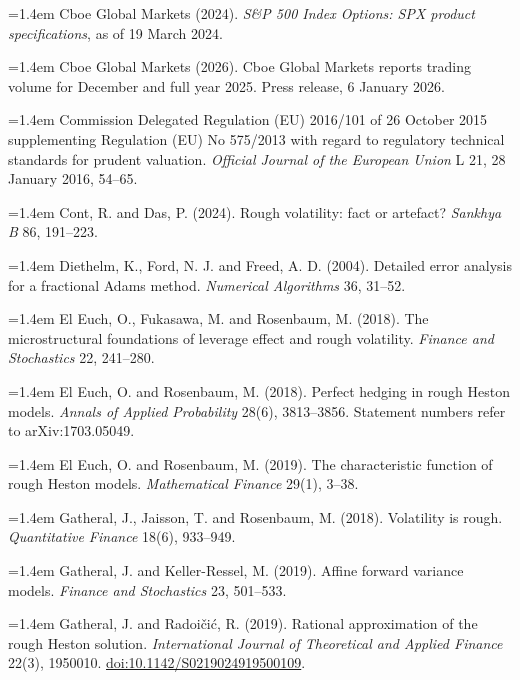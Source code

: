 \documentclass[11pt,a4paper]{article}
\begin{document}
\hangindent=1.4em Cboe Global Markets (2024). \emph{S\&P 500 Index Options: SPX product specifications}, as of 19 March 2024.\par

\hangindent=1.4em Cboe Global Markets (2026). Cboe Global Markets reports trading volume for December and full year 2025. Press release, 6 January 2026.\par

\hangindent=1.4em Commission Delegated Regulation (EU) 2016/101 of 26 October 2015 supplementing Regulation (EU) No 575/2013 with regard to regulatory technical standards for prudent valuation. \emph{Official Journal of the European Union} L 21, 28 January 2016, 54–65.\par

\hangindent=1.4em Cont, R. and Das, P. (2024). Rough volatility: fact or artefact? \emph{Sankhya B} 86, 191–223.\par

\hangindent=1.4em Diethelm, K., Ford, N. J. and Freed, A. D. (2004). Detailed error analysis for a fractional Adams method. \emph{Numerical Algorithms} 36, 31–52.\par

\hangindent=1.4em El Euch, O., Fukasawa, M. and Rosenbaum, M. (2018). The microstructural foundations of leverage effect and rough volatility. \emph{Finance and Stochastics} 22, 241–280.\par

\hangindent=1.4em El Euch, O. and Rosenbaum, M. (2018). Perfect hedging in rough Heston models. \emph{Annals of Applied Probability} 28(6), 3813–3856. Statement numbers refer to arXiv:1703.05049.\par

\hangindent=1.4em El Euch, O. and Rosenbaum, M. (2019). The characteristic function of rough Heston models. \emph{Mathematical Finance} 29(1), 3–38.\par

\hangindent=1.4em Gatheral, J., Jaisson, T. and Rosenbaum, M. (2018). Volatility is rough. \emph{Quantitative Finance} 18(6), 933–949.\par

\hangindent=1.4em Gatheral, J. and Keller-Ressel, M. (2019). Affine forward variance models. \emph{Finance and Stochastics} 23, 501–533.\par

\hangindent=1.4em Gatheral, J. and Radoičić, R. (2019). Rational approximation of the rough Heston solution. \emph{International Journal of Theoretical and Applied Finance} 22(3), 1950010. \href{https://doi.org/10.1142/S0219024919500109}{doi:10.1142/S0219024919500109}.\par
\end{document}
